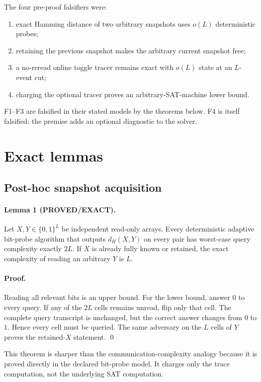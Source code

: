 \documentclass[11pt]{article}
\newcommand{\status}[1]{\textsf{#1}}
\begin{document}
The four pre-proof falsifiers were:
\begin{enumerate}[label=F\arabic*.]
\item exact Hamming distance of two arbitrary snapshots uses $o(L)$ deterministic probes;
\item retaining the previous snapshot makes the arbitrary current snapshot free;
\item a no-reread online toggle tracer remains exact with $o(L)$ state at an $L$-event cut;
\item charging the optional tracer proves an arbitrary-SAT-machine lower bound.
\end{enumerate}
F1--F3 are falsified in their stated models by the theorems below.  F4 is itself falsified: the premise adds an optional diagnostic to the solver.

\section{Exact lemmas}
\subsection{Post-hoc snapshot acquisition}
\paragraph{Lemma 1 (\status{PROVED/EXACT}).}
Let $X,Y\in\{0,1\}^L$ be independent read-only arrays.  Every deterministic adaptive bit-probe algorithm that outputs $d_H(X,Y)$ on every pair has worst-case query complexity exactly $2L$.  If $X$ is already fully known or retained, the exact complexity of reading an arbitrary $Y$ is $L$.

\paragraph{Proof.}
Reading all relevant bits is an upper bound.  For the lower bound, answer $0$ to every query.  If any of the $2L$ cells remains unread, flip only that cell.  The complete query transcript is unchanged, but the correct answer changes from $0$ to $1$.  Hence every cell must be queried.  The same adversary on the $L$ cells of $Y$ proves the retained-$X$ statement. \qed

This theorem is sharper than the communication-complexity analogy because it is proved directly in the declared bit-probe model.  It charges only the trace computation, not the underlying SAT computation.
\end{document}

